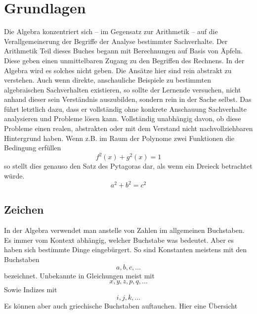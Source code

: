 \chapter{Grundlagen}

Die Algebra konzentriert sich -- im Gegensatz zur Arithmetik -- auf die Verallgemeinerung der Begriffe der Analyse bestimmter Sachverhalte. Der Arithmetik Teil dieses Buches begann mit Berechnungen auf Basis von Äpfeln. Diese geben einen unmittelbaren Zugang zu den Begriffen des Rechnens. In der Algebra wird es solches nicht geben. Die Ansätze hier sind rein abstrakt zu verstehen. Auch wenn direkte, anschauliche Beispiele zu bestimmten algebraischen Sachverhalten existieren, so sollte der Lernende versuchen, nicht anhand dieser sein Verständnis auszubilden, sondern rein in der Sache selbst. Das führt letztlich dazu, dass er vollständig ohne konkrete Anschauung Sachverhalte analysieren und Probleme lösen kann. Vollständig unabhängig davon, ob diese Probleme einen realen, abstrakten oder mit dem Verstand nicht nachvollziehbaren Hintergrund haben. Wenn z.B. im Raum der Polynome zwei Funktionen die Bedingung erfüllen
\[f^2(x) + g^2(x) = 1 \]
so stellt dies genauso den Satz des Pytagoras dar, als wenn ein Dreieck betrachtet würde. 
\[a^2 +b^2 = c^2\]

\section{Zeichen}

In der Algebra verwendet man anstelle von Zahlen im allgemeinen Buchstaben. Es immer vom Kontext abhängig, welcher Buchstabe was bedeutet. Aber es haben sich bestimmte Dinge eingebürgert. So sind Konstanten meistens mit den Buchstaben
\[a, b, c, \dots \]
bezeichnet. Unbekannte in Gleichungen meist mit 
\[x, y, z, p, q, \dots \]
Sowie Indizes mit 
\[i, j, k, \dots \]
Es können aber auch griechische Buchstaben auftauchen. Hier eine Übersicht

\bigskip

